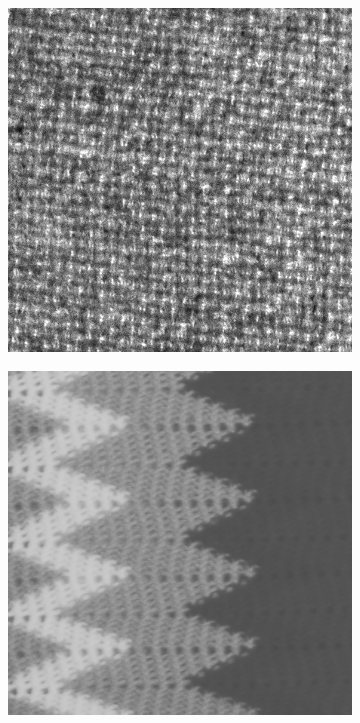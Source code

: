 \begin{figure}[h!]
\begin{subfigure}{.15\textwidth}
  \centering
  \includegraphics[width=.8\linewidth]{kylberg_examples/blanket1_003.png}
\end{subfigure}%
\begin{subfigure}{.15\textwidth}
  \centering
  \includegraphics[width=.8\linewidth]{kylberg_examples/blanket2_003.png}
\end{subfigure}
\begin{subfigure}{.15\textwidth}
  \centering

\end{subfigure}
\end{figure}

